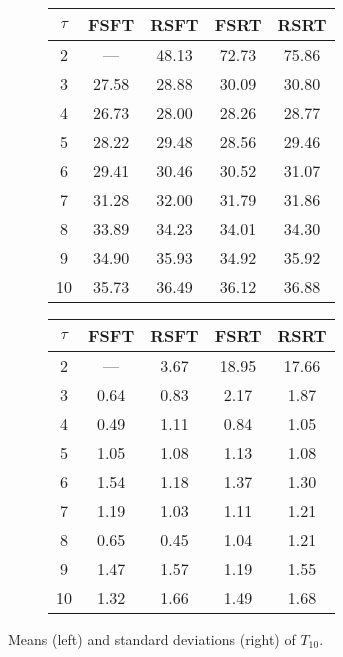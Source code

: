 \documentclass[12pt]{article}
\numberwithin{figure}{section}
\numberwithin{equation}{section}
\begin{document}
\begin{figure}[htbp]
\centering
\begin{subfigure}{0.5\textwidth}
\centering
\begin{tabular}{|c|c|c|c|c|}
	\hline
	$\tau$ & FSFT & RSFT & FSRT & RSRT \\\hline\hline
	2 & --- & 48.13 & 72.73 & 75.86 \\\hline
	3 & 27.58 & 28.88 & 30.09 & 30.80 \\\hline
	4 & 26.73 & 28.00 & 28.26 & 28.77 \\\hline
	5 & 28.22 & 29.48 & 28.56 & 29.46 \\\hline
	6 & 29.41 & 30.46 & 30.52 & 31.07 \\\hline
	7 & 31.28 & 32.00 & 31.79 & 31.86 \\\hline
	8 & 33.89 & 34.23 & 34.01 & 34.30 \\\hline
	9 & 34.90 & 35.93 & 34.92 & 35.92 \\\hline
	10 & 35.73 & 36.49 & 36.12 & 36.88 \\\hline
\end{tabular}
\end{subfigure}%
\begin{subfigure}{0.5\textwidth}
\centering
\begin{tabular}{|c|c|c|c|c|}
	\hline
	$\tau$ & FSFT & RSFT & FSRT & RSRT \\\hline\hline
	2 & --- & 3.67 & 18.95 & 17.66 \\\hline
	3 & 0.64 & 0.83 & 2.17 & 1.87 \\\hline
	4 & 0.49 & 1.11 & 0.84 & 1.05 \\\hline
	5 & 1.05 & 1.08 & 1.13 & 1.08 \\\hline
	6 & 1.54 & 1.18 & 1.37 & 1.30 \\\hline
	7 & 1.19 & 1.03 & 1.11 & 1.21 \\\hline
	8 & 0.65 & 0.45 & 1.04 & 1.21 \\\hline
	9 & 1.47 & 1.57 & 1.19 & 1.55 \\\hline
	10 & 1.32 & 1.66 & 1.49 & 1.68 \\\hline
\end{tabular}
\end{subfigure}

\caption{Means (left) and standard deviations (right) of $T_{10}$.}
\label{Tvalues}
\end{figure}
\end{document}
